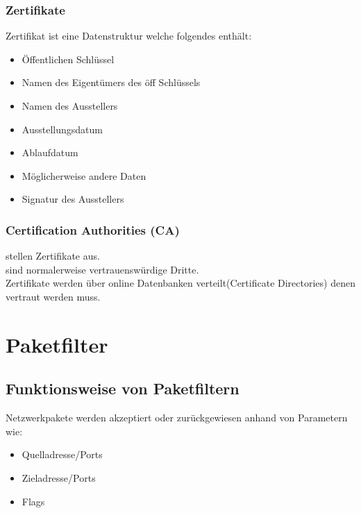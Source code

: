 \documentclass{article} %
\begin{document}
\subsubsection{Zertifikate}
Zertifikat ist eine Datenstruktur welche folgendes enthält:
\begin{itemize}
	\item Öffentlichen Schlüssel
    \item Namen des Eigentümers des öff Schlüssels
    \item Namen des Ausstellers
    \item Ausstellungsdatum
    \item Ablaufdatum
    \item Möglicherweise andere Daten
    \item Signatur des Ausstellers
\end{itemize}
\subsubsection{Certification Authorities (CA)}
stellen Zertifikate aus.\\
sind normalerweise vertrauenswürdige Dritte.\\
Zertifikate werden über online Datenbanken verteilt(Certificate Directories) denen vertraut werden muss.


\section{Paketfilter}
 \subsection{Funktionsweise von Paketfiltern}
Netzwerkpakete werden akzeptiert oder zurückgewiesen anhand von Parametern wie:
\begin{itemize}
	\item Quelladresse/Ports
    \item Zieladresse/Ports
    \item Flags
\end{itemize}
\end{document}
